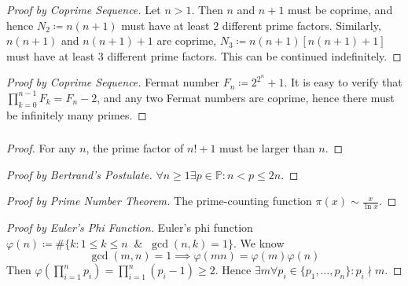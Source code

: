 \documentclass[UTF8,11pt,colorlinks,compress,openany]{beamer}%
\begin{document}
\begin{frame}\frametitle{}
\begin{proof}[Proof by Coprime Sequence]
Let $n>1$. Then $n$ and $n+1$ must be coprime, and hence $N_2\coloneqq n(n + 1)$ must have at least $2$ different prime factors. Similarly, $n(n+1)$ and $n(n+1)+1$ are coprime, $N_3\coloneqq n(n + 1)[n(n + 1) + 1]$ must have at least $3$ different prime factors. This can be continued indefinitely.
\end{proof}
\begin{proof}[Proof by Coprime Sequence]
Fermat number $F_n\coloneqq 2^{2^n}+1$. It is easy to verify that $\prod\limits_{k=0}^{n-1}F_k=F_n-2$, and any two Fermat numbers are coprime, hence there must be infinitely many primes.
\end{proof}
\end{frame}

\begin{frame}\frametitle{}
\begin{proof}
For any $n$, the prime factor of $n!+1$ must be larger than $n$.
\end{proof}
\begin{proof}[Proof by Bertrand's Postulate]
$\forall n\geq 1\exists p\in\mathbb{P}: n<p\leq 2n$.
\end{proof}
\begin{proof}[Proof by Prime Number Theorem]
The prime-counting function $\pi(x)\sim\frac{x}{\ln x}$.
\end{proof}
\begin{proof}[Proof by Euler's Phi Function]
Euler's phi function $\varphi(n)\coloneqq \#\{k: 1\leq k\leq n\;\;\&\;\;\gcd(n,k)=1\}$. We know
\[\gcd(m,n)=1\implies\varphi(mn)=\varphi(m)\varphi(n)\]
Then $\varphi\left(\prod\limits_{i=1}^n p_i\right)=\prod\limits_{i=1}^n(p_i-1)\geq 2$. Hence $\exists m\forall p_i\in\{p_1,\dots,p_n\}: p_i\nmid m$.
\end{proof}
\end{frame}
\end{document}
